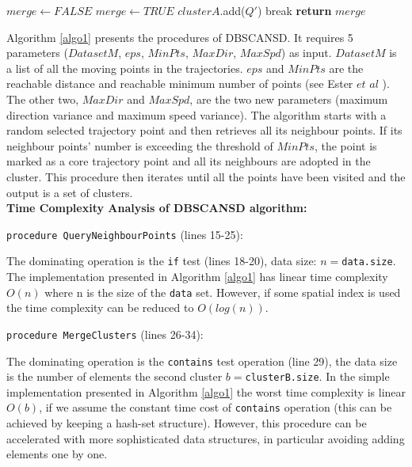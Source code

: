 \documentclass[12pt,glossary]{dalcsthesis}
\begin{document}
\begin{algorithm}
\begin{algorithmic}[1]

\State $merge \gets FALSE$
{}
        \State $merge \gets TRUE$
            \State $clusterA$.add($Q'$)
        \EndFor
    \State break
    \EndIf
\EndFor
\State \textbf{return} $merge$
\EndProcedure


\end{algorithmic}
\end{algorithm}





Algorithm \ref{algo1} presents the procedures of DBSCANSD. It requires 5 parameters ($DatasetM$, $eps$, $MinPts$, $MaxDir$, $MaxSpd$) as input. $DatasetM$ is a list of all the moving points in the trajectories.  $eps$ and $MinPts$ are the reachable distance and reachable minimum number of points (see Ester $et$ $al$ \cite{DBScan96}).  The other two, $MaxDir$ and $MaxSpd$, are the two new parameters (maximum direction variance and maximum speed variance).  The algorithm starts with a random selected trajectory point and then retrieves all its neighbour points. If its neighbour points' number is exceeding the threshold of $MinPts$, the point is marked as a core trajectory point and all its neighbours are adopted in the cluster. This procedure then iterates until all the points have been visited and the output is a set of clusters. \\



\noindent\textbf{Time Complexity Analysis of DBSCANSD algorithm:}

\noindent\texttt{procedure QueryNeighbourPoints} (lines 15-25):

\noindent The dominating operation is the \texttt{if} test (lines 18-20), data size: $n=$\texttt{data.size}.
The implementation presented in Algorithm \ref{algo1} has linear time complexity $O(n)$ where n is the size of the \texttt{data} set. However, if some spatial index is used the time complexity can be reduced to $O(log(n))$.


\noindent\texttt{procedure MergeClusters} (lines 26-34):

\noindent The dominating operation is the \texttt{contains} test operation (line 29), the data size is the number of elements the second cluster $b=$\texttt{clusterB.size}.
In the simple implementation presented in Algorithm \ref{algo1} the worst time complexity is linear $O(b)$, if we assume the constant time cost of \texttt{contains} operation (this can be achieved by keeping a hash-set structure). However, this procedure can be accelerated with more sophisticated data structures, in particular avoiding adding elements one by one.
\end{document}
